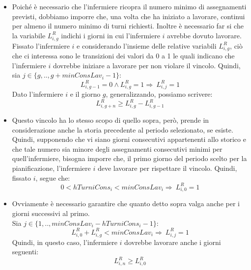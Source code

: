 \begin{itemize}
\item Poiché è necessario che l'infermiere ricopra il numero minimo di assegnamenti previsti, dobbiamo imporre che, una volta che ha iniziato a lavorare, continui per almeno il numero minimo di turni richiesti. Inoltre è necessario far si che la variabile $L_{i, g}^R$ indichi i giorni in cui l'infermiere $i$ avrebbe dovuto lavorare.
Fissato l'infermiere $i$ e considerando l'insieme delle relative variabili $L_{i, g}^R$, ciò che ci interessa sono le transizioni dei valori da 0 a 1 le quali indicano che l'infermiere $i$ dovrebbe iniziare a lavorare per non violare il vincolo. 
Quindi, sia $j \in \{g,.., g + minConsLav_i - 1\}$:\\
\begin{equation}
L_{i, g-1}^R = 0 \wedge L_{i, g}^R = 1 \Longrightarrow\ L_{i, j}^R = 1
\end{equation}
Dato l'infermiere $i$ e il giorno $g$, generalizzando, possiamo scrivere:
\begin{equation}
L_{i, g+n}^R \geq L_{i, g}^R - L_{i, g-1}^R
\end{equation}

\item Questo vincolo ha lo stesso scopo di quello sopra, però, prende in considerazione anche la storia precedente al periodo selezionato, se esiste.
Quindi, supponendo che vi siano giorni consecutivi appartenenti allo storico e che tale numero sia minore degli assegnamenti consecutivi minimi per quell'infermiere, bisogna imporre che, il primo giorno del periodo scelto per la pianificazione, l'infermiere $i$ deve lavorare per rispettare il vincolo. Quindi, fissato $i$, segue che:
\begin{equation}
0 < hTurniCons_i < minConsLav_i \Longrightarrow\ L_{i, 0}^R = 1
\end{equation}

\item Ovviamente è necessario garantire che quanto detto sopra valga anche per i giorni successivi al primo. \\
Sia  $j \in \{1,.., minConsLav_i - hTurniCons_i - 1\}$:\\
\begin{equation}
L_{i, 0}^R + L_{i, g}^R <  minConsLav_i \Longrightarrow\ L_{i, j}^R = 1
\end{equation}
Quindi, in questo caso, l'infermiere $i$ dovrebbe lavorare anche i giorni seguenti:
\begin{equation}
L_{i, n}^R \geq L_{i, 0}^R
\end{equation}
\end{itemize}

